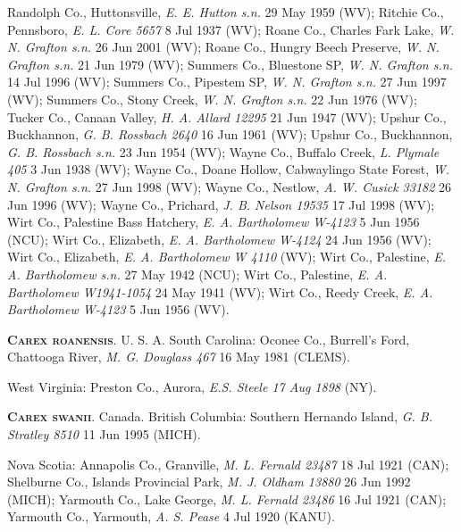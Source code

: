 \documentclass{article}
\begin{document}
Randolph Co., Huttonsville, \textit{E. E. Hutton s.n.} 29 May 1959 (WV);
Ritchie Co., Pennsboro, \textit{E. L. Core 5657} 8 Jul 1937 (WV);
Roane Co., Charles Fark Lake, \textit{W. N. Grafton s.n.} 26 Jun 2001 (WV);
Roane Co., Hungry Beech Preserve, \textit{W. N. Grafton s.n.} 21 Jun 1979 (WV);
Summers Co., Bluestone SP, \textit{W. N. Grafton s.n.} 14 Jul 1996 (WV);
Summers Co., Pipestem SP, \textit{W. N. Grafton s.n.} 27 Jun 1997 (WV);
Summers Co., Stony Creek, \textit{W. N. Grafton s.n.} 22 Jun 1976 (WV);
Tucker Co., Canaan Valley, \textit{H. A. Allard 12295} 21 Jun 1947 (WV);
Upshur Co., Buckhannon, \textit{G. B. Rossbach 2640} 16 Jun 1961 (WV);
Upshur Co., Buckhannon, \textit{G. B. Rossbach s.n.} 23 Jun 1954 (WV);
Wayne Co., Buffalo Creek, \textit{L. Plymale 405} 3 Jun 1938 (WV);
Wayne Co., Doane Hollow, Cabwaylingo State Forest, \textit{W. N. Grafton s.n.} 27 Jun 1998 (WV);
Wayne Co., Nestlow, \textit{A. W. Cusick 33182} 26 Jun 1996 (WV);
Wayne Co., Prichard, \textit{J. B. Nelson 19535} 17 Jul 1998 (WV);
Wirt Co., Palestine Bass Hatchery, \textit{E. A. Bartholomew W-4123} 5 Jun 1956 (NCU);
Wirt Co., Elizabeth, \textit{E. A. Bartholomew W-4124} 24 Jun 1956 (WV);
Wirt Co., Elizabeth, \textit{E. A. Bartholomew W 4110}  (WV);
Wirt Co., Palestine, \textit{E. A. Bartholomew s.n.} 27 May 1942 (NCU);
Wirt Co., Palestine, \textit{E. A. Bartholomew W1941-1054} 24 May 1941 (WV);
Wirt Co., Reedy Creek, \textit{E. A. Bartholomew W-4123} 5 Jun 1956 (WV).

\textbf{\textsc{Carex roanensis}}. U. S. A.
South Carolina:
Oconee Co., Burrell's Ford, Chattooga River, \textit{M. G. Douglass
  467} 16 May 1981 (CLEMS).

West Virginia:
Preston	Co., Aurora, \textit{E.S. Steele 17 Aug 1898} (NY).

\textbf{\textsc{Carex swanii}}. Canada. 
British Columbia:
Southern Hernando Island, \textit{G. B. Stratley 8510} 11 Jun 1995 (MICH).

Nova Scotia:
Annapolis Co., Granville, \textit{M. L. Fernald 23487} 18 Jul 1921 (CAN);
Shelburne Co., Islands Provincial Park, \textit{M. J. Oldham 13880} 26 Jun 1992 (MICH);
Yarmouth Co., Lake George, \textit{M. L. Fernald 23486} 16 Jul 1921 (CAN);
Yarmouth Co., Yarmouth, \textit{A. S. Pease} 4 Jul 1920 (KANU).
\end{document}
